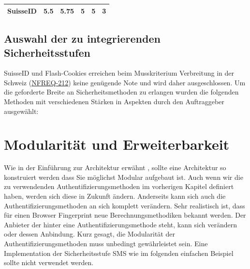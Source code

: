 \begin{longtable}[c]{@{}lllllc@{}}
\begin{minipage}[t]{0.19\columnwidth}
\textbf{SuisseID}
\strut\end{minipage} &
\begin{minipage}[t]{0.13\columnwidth}\raggedright\strut
5.5
\strut\end{minipage} &
\begin{minipage}[t]{0.13\columnwidth}\raggedright\strut
5.75
\strut\end{minipage} &
\begin{minipage}[t]{0.11\columnwidth}\raggedright\strut
5
\strut\end{minipage} &
\begin{minipage}[t]{0.13\columnwidth}\raggedright\strut
5
\strut\end{minipage} &
\begin{minipage}[t]{0.13\columnwidth}\centering\strut
3
\strut\end{minipage}\tabularnewline
\bottomrule
\end{longtable}

\subsection{Auswahl der zu integrierenden
Sicherheitsstufen}\label{auswahl-der-zu-integrierenden-sicherheitsstufen}

SuisseID und Flash-Cookies erreichen beim Musskriterium Verbreitung in
der Schweiz (\protect\hyperlink{ux5cux23ux5cux23NFREQ-212}{NFREQ-212})
keine genügende Note und wird daher ausgeschlossen. Um die geforderte
Breite an Sicherheitsmethoden zu erlangen wurden die folgenden Methoden
mit verschiedenen Stärken in Aspekten durch den Auftraggeber ausgewählt:

\newpage

\section{Modularität und
Erweiterbarkeit}\label{modularituxe4t-und-erweiterbarkeit}

Wie in der Einführung zur Architektur erwähnt , sollte eine Architektur
so konstruiert werden dass Sie möglichst Modular aufgebaut ist. Auch
wenn wir die zu verwendenden Authentifizierungsmethoden im vorherigen
Kapitel definiert haben, werden sich diese in Zukunft ändern. Anderseits
kann sich auch die Authentifizierungsmethoden an sich komplett
verändern. Sehr realistisch ist, dass für einen Browser Fingerprint neue
Berechnungsmethodiken bekannt werden. Der Anbieter der hinter eine
Authentifizierungsmethode steht, kann sich verändern oder dessen
Anbindung. Kurz gesagt, die Modularität der Authentifizierungsmethoden
muss unbedingt gewährleistet sein. Eine Implementation der
Sicherheitsstufe SMS wie im folgenden einfachen Beispiel sollte nicht
verwendet werden.

